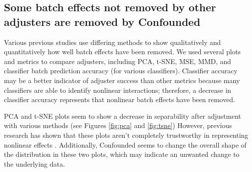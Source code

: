 \documentclass[notitlepage]{article}
\begin{document}
\subsection{Some batch effects not removed by other adjusters are removed by Confounded}

Various previous studies use differing methods to show qualitatively and quantitatively how well batch effects have been removed.
We used several plots and metrics to compare adjusters, including PCA, t-SNE, MSE, MMD, and classifier batch prediction accuracy (for various classifiers).
Classifier accuracy may be a better indicator of adjuster success than other metrics because many classifiers are able to identify nonlinear interactions;
therefore, a decrease in classifier accuracy represents that nonlinear batch effects have been removed.

PCA and t-SNE plots seem to show a decrease in separability after adjustment with various methods (see Figures \ref{fig:pca} and \ref{fig:tsne})
However, previous research has shown that these plots aren't completely trustworthy in representing nonlinear effects \cite{dayton_classifying_2017-1}.
Additionally, Confounded seems to change the overall shape of the distribution in these two plots, which may indicate an unwanted change to the underlying data.
\end{document}
